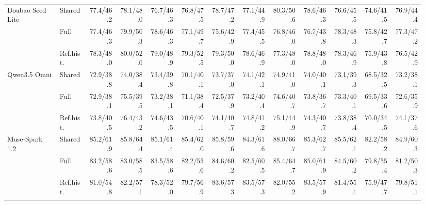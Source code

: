 \begin{table}[htbp]
\begin{tabular*}{\linewidth}{@{}ll@{\extracolsep{\fill}}*{11}{r}@{}}
\addlinespace[2pt]
Doubao Seed Lite & Shared & 77.4/46.2 & 78.1/48.0 & 76.7/46.3 & 76.8/47.5 & 78.7/47.2 & 77.1/44.9 & 80.3/50.6 & 78.6/46.3 & 76.6/45.5 & 74.6/41.5 & 76.9/44.4 \\
 & Full & 77.4/46.3 & 79.9/50.3 & 78.6/46.3 & 77.1/49.7 & 75.6/42.9 & 77.4/45.5 & 76.8/46.0 & 76.7/43.8 & 78.3/48.3 & 75.8/42.7 & 77.3/47.2 \\
 & Ref.hist. & 78.3/48.0 & 80.0/52.0 & 79.0/48.9 & 79.3/52.5 & 79.3/50.0 & 78.6/46.9 & 77.3/48.0 & 78.8/48.0 & 78.3/46.9 & 75.9/43.8 & 76.5/42.9 \\
\addlinespace[2pt]
Qwen3.5 Omni & Shared & 72.9/38.8 & 74.0/38.4 & 73.4/39.8 & 70.1/40.1 & 73.7/37.0 & 74.1/42.1 & 74.9/41.0 & 74.0/40.1 & 73.1/39.3 & 68.5/32.5 & 73.2/38.1 \\
 & Full & 72.9/38.1 & 75.5/39.5 & 73.2/38.1 & 71.1/38.4 & 72.5/37.9 & 73.2/40.4 & 74.6/40.7 & 73.8/36.7 & 73.3/40.1 & 69.5/33.6 & 72.6/35.9 \\
 & Ref.hist. & 73.8/40.5 & 76.4/43.2 & 74.6/43.5 & 70.6/40.1 & 74.1/40.7 & 74.8/41.2 & 75.1/44.9 & 74.3/40.7 & 73.8/38.4 & 70.0/34.5 & 74.1/37.6 \\
\addlinespace[2pt]
Muse-Spark 1.2 & Shared & 85.2/61.9 & 85.8/64.4 & 85.1/61.4 & 85.4/62.0 & 85.8/59.6 & 84.3/61.6 & 88.0/66.7 & 85.3/62.7 & 85.5/62.1 & 82.2/58.2 & 84.9/60.3 \\
 & Full & 83.2/58.6 & 83.0/58.5 & 83.5/58.6 & 82.2/55.6 & 84.6/60.2 & 82.5/60.5 & 85.4/64.7 & 85.0/61.9 & 84.5/60.2 & 79.8/55.4 & 81.2/50.3 \\
 & Ref.hist. & 81.0/54.8 & 82.2/57.1 & 78.3/52.0 & 79.7/56.9 & 83.6/57.3 & 83.5/57.3 & 82.0/55.2 & 83.5/57.9 & 81.4/55.1 & 75.9/47.7 & 79.8/51.1 \\
\addlinespace[2pt]
\bottomrule
\end{tabular*}
\endgroup
\end{table}

